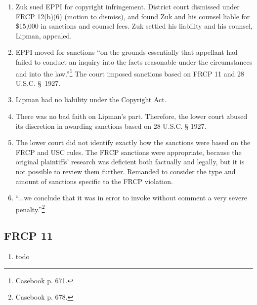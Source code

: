 \begin{enumerate}
    \item Zuk sued EPPI for copyright infringement. District court dismissed under FRCP 12(b)(6) (motion to dismiss), and found Zuk and his counsel liable for \$15,000 in sanctions and counsel fees. Zuk settled his liability and his counsel, Lipman, appealed.
    \item EPPI moved for sanctions ``on the grounds essentially that appellant had failed to conduct an inquiry into the facts reasonable under the circumstances and into the law.''\footnote{Casebook p. 671.} The court imposed sanctions based on FRCP 11 and 28 U.S.C. § 1927.
    \item Lipman had no liability under the Copyright Act.
    \item There was no bad faith on Lipman's part. Therefore, the lower court abused its discretion in awarding sanctions based on 28 U.S.C. § 1927.
    \item The lower court did not identify exactly how the sanctions were based on the FRCP and USC rules. The FRCP sanctions were appropriate, because the original plaintiffs' research was deficient both factually and legally, but it is not possible to review them further. Remanded to consider the type and amount of sanctions specific to the FRCP violation.
    \item ``...we conclude that it was in error to invoke without comment a very severe penalty.''\footnote{Casebook p. 678.}
\end{enumerate}

\subsection{FRCP 11}

\begin{enumerate}
    \item todo
\end{enumerate}

